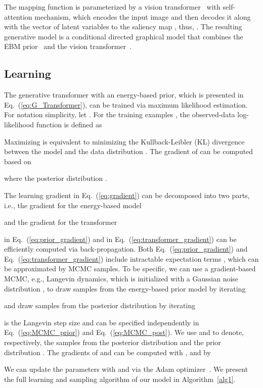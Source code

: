 \documentclass{article}
\begin{document}
The mapping function  is parameterized by a vision  transformer~\cite{liu2021swin} with self-attention mechanism, which encodes the input image  and then decodes it along with the vector of latent variables  to the saliency map , thus, . The resulting generative model is a conditional directed graphical model that combines the EBM prior~\cite{ebm_prior} and the vision transformer~\cite{liu2021swin}.  

\subsection{Learning}



The generative transformer with an energy-based prior, which is presented in Eq.~(\ref{eq:G_Transformer}), can be trained via maximum likelihood estimation. For notation simplicity, let . For the training examples , the observed-data log-likelihood function is defined as

Maximizing  is equivalent to minimizing the Kullback-Leibler (KL) divergence between the model  and the data distribution . The gradient of  can be computed based on

where the posterior distribution . 



The learning gradient in Eq.~(\ref{eq:gradient}) can be decomposed into two parts, i.e., the gradient for the energy-based model 

and the gradient for the transformer 

 in Eq.~(\ref{eq:prior_gradient}) and
 in Eq.~(\ref{eq:transformer_gradient}) can be efficiently computed via back-propagation. Both Eq.~(\ref{eq:prior_gradient}) and Eq.~(\ref{eq:transformer_gradient}) include intractable expectation terms , which can be approximated by MCMC samples. To be specific, we can use a gradient-based MCMC, e.g., Langevin dynamics, which is initialized with a Gaussian noise distribution , to draw samples from the energy-based prior model  by iterating

and draw samples from the posterior distribution  by iterating

 is the Langevin step size and can be specified independently in Eq.~(\ref{eq:MCMC_prior}) and Eq.~(\ref{eq:MCMC_post}). We use  and  to denote, respectively, the samples from the posterior distribution  and the prior distribution . The gradients of  and  can be computed with ,  and  by

We can update the parameters with  and  via the Adam optimizer~\cite{kingma2014adam}. We present the full learning and sampling algorithm of our model in Algorithm~\ref{alg1}.
\end{document}
